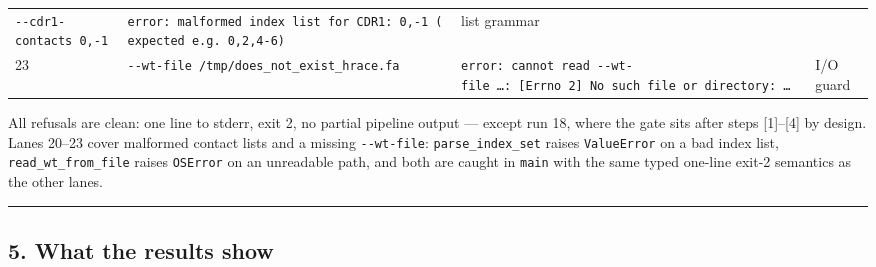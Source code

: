 \documentclass[12pt,a4paper]{article}
\begin{document}
\begin{longtable}[]{@{}llll@{}}
\begin{minipage}[t]{0.22\columnwidth}
\texttt{-\/-cdr1-contacts\ 0,-1}\strut
\end{minipage} & \begin{minipage}[t]{0.22\columnwidth}\raggedright
\texttt{error:\ malformed\ index\ list\ for\ CDR1:\ \textquotesingle{}0,-1\textquotesingle{}\ (expected\ e.g.\ 0,2,4-6)}\strut
\end{minipage} & \begin{minipage}[t]{0.22\columnwidth}\raggedright
list grammar\strut
\end{minipage}\tabularnewline
\begin{minipage}[t]{0.22\columnwidth}\raggedright
23\strut
\end{minipage} & \begin{minipage}[t]{0.22\columnwidth}\raggedright
\texttt{-\/-wt-file\ /tmp/does\_not\_exist\_hrace.fa}\strut
\end{minipage} & \begin{minipage}[t]{0.22\columnwidth}\raggedright
\texttt{error:\ cannot\ read\ -\/-wt-file\ \ldots{}:\ {[}Errno\ 2{]}\ No\ such\ file\ or\ directory:\ \ldots{}}\strut
\end{minipage} & \begin{minipage}[t]{0.22\columnwidth}\raggedright
I/O guard\strut
\end{minipage}\tabularnewline
\bottomrule
\end{longtable}

All refusals are clean: one line to stderr, exit 2, no partial pipeline
output --- except run 18, where the gate sits after steps
{[}1{]}--{[}4{]} by design. Lanes 20--23 cover malformed contact lists
and a missing \texttt{-\/-wt-file}: \texttt{parse\_index\_set} raises
\texttt{ValueError} on a bad index list, \texttt{read\_wt\_from\_file}
raises \texttt{OSError} on an unreadable path, and both are caught in
\texttt{main} with the same typed one-line exit-2 semantics as the other
lanes.

\begin{center}\rule{0.5\linewidth}{0.5pt}\end{center}

\hypertarget{what-the-results-show}{%
\subsection{5. What the results show}\label{what-the-results-show}}
\end{document}
